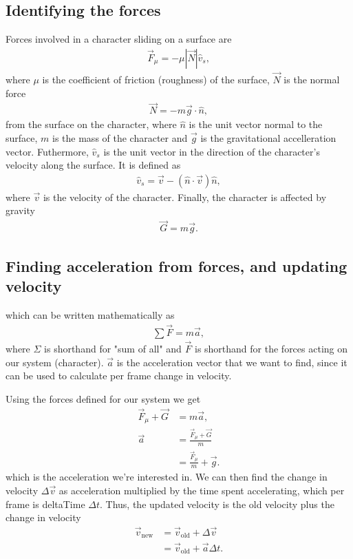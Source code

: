 \documentclass[%
notitlepage,
 amsmath,amssymb,
 aps,
]{revtex4-2}  %
\begin{document}
\subsection{Identifying the forces}
Forces involved in a character sliding on a surface are
\begin{align*}
	\vec{F}_{\mu} = -\mu |\vec{N}| \hat{v}_{s},
\end{align*}
where \(\mu\) is the coefficient of friction (roughness) of the surface, \(\vec{N}\) is the normal force
\begin{align*}
	\vec{N} = - m\vec{g}\cdot \hat{n},
\end{align*}
from the surface on the  character, where \(\hat{n}\) is the unit vector normal to the surface, \(m\) is the mass of the character and \(\vec{g}\) is the gravitational accelleration vector. Futhermore, \(\hat{v}_{s}\) is the unit vector in the direction of the character's velocity along the surface. It is defined as
\begin{align*}
	\hat{v}_{s} = \vec{v} - \left(\hat{n} \cdot \vec{v}\right)\hat{n},
\end{align*}
where \(\vec{v}\) is the velocity of the character.
Finally, the character is affected by gravity
\begin{align*}
	\vec{G} = m\vec{g}.
\end{align*}

\subsection{Finding acceleration from forces, and updating velocity}
which can be written mathematically as
\begin{align*}
	\sum \vec{F} = m\vec{a},
\end{align*}
where \(\Sigma\) is shorthand for "sum of all" and \(\vec{F}\) is shorthand for the forces acting on our system (character). \(\vec{a}\) is the acceleration vector that we want to find, since it can be used to calculate per frame change in velocity.
 
Using the forces defined for our system we get
 \begin{align*}
    \vec{F}_{\mu} + \vec{G} &= m\vec{a}, \\
    \vec{a} &= \frac{\vec{F}_{\mu} + \vec{G}}{m} \\
            &= \frac{\vec{F}_{\mu}}{m} + \vec{g}.
\end{align*}
which is the acceleration we're interested in. We can then find the change in velocity \(\Delta\vec{v}\) as acceleration multiplied by the time spent accelerating, which per frame is deltaTime \(\Delta t\). Thus, the updated velocity is the old velocity plus the change in velocity
\begin{align*}
    \vec{v}_{\text{new}} &= \vec{v}_{\text{old}} + \Delta\vec{v} \\
                         &= \vec{v}_{\text{old}} + \vec{a}\Delta t.
\end{align*}
\end{document}
